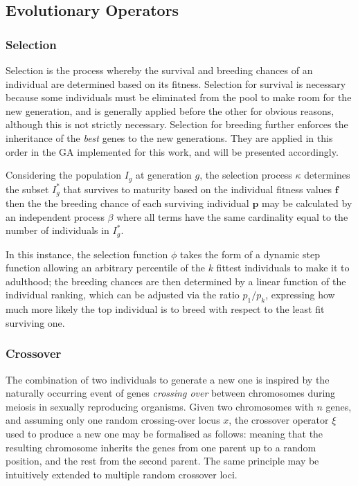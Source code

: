 \subsection{Evolutionary Operators}
\subsubsection{Selection}
Selection is the process whereby the survival and breeding chances of an individual are determined based on its fitness. Selection for survival is necessary because some individuals must be eliminated from the pool to make room for the new generation, and is generally applied before the other for obvious reasons, although this is not strictly necessary. Selection for breeding further enforces the inheritance of the \emph{best} genes to the new generations. They are applied in this order in the GA implemented for this work, and will be presented accordingly.

Considering the population $I_g$ at generation $g$, the selection process $\kappa$ determines the subset $I_g^*$ that survives to maturity based on the individual fitness values $\mathbf{f}$
then the the breeding chance of each surviving individual $\mathbf{p}$ may be calculated by an independent process $\beta$
where all terms have the same cardinality equal to the number of individuals in $I_g^*$.

In this instance, the selection function $\phi$ takes the form of a dynamic step function allowing an arbitrary percentile of the $k$ fittest individuals to make it to adulthood; the breeding chances are then determined by a linear function of the individual ranking, which can be adjusted via the ratio $p_1 / p_k$, expressing how much more likely the top individual is to breed with respect to the least fit surviving one.

\subsubsection{Crossover}
The combination of two individuals to generate a new one is inspired by the naturally occurring event of genes \emph{crossing over} between chromosomes during meiosis in sexually reproducing organisms.
Given two chromosomes with $n$ genes, and assuming only one random crossing-over locus $x$, the crossover operator $\xi$ used to produce a new one may be formalised as follows:
meaning that the resulting chromosome inherits the genes from one parent up to a random position, and the rest from the second parent. The same principle may be intuitively extended to multiple random crossover loci.

